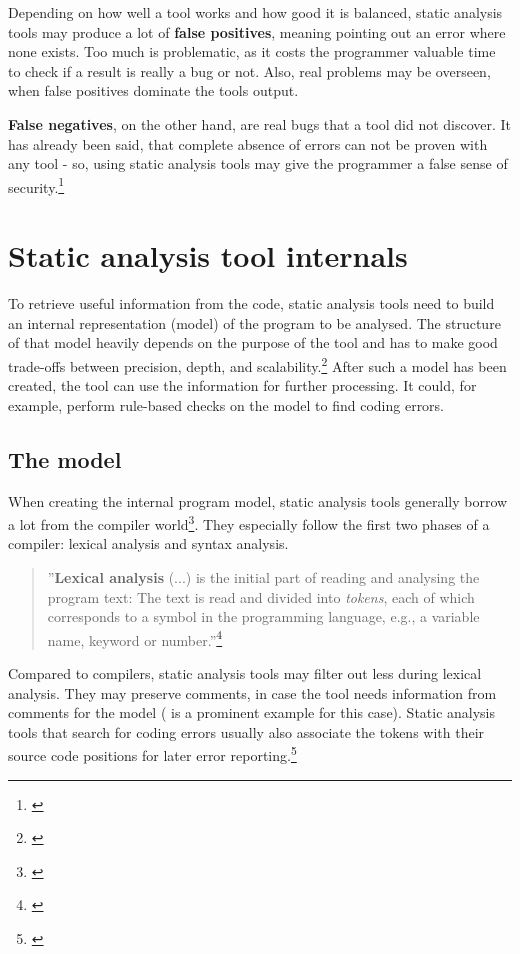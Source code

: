 Depending on how well a tool works and how good it is balanced, static analysis tools may produce a lot of \textbf{false positives}, meaning pointing out an error where none exists. Too much  is problematic, as it costs the programmer valuable time to check if a result is really a bug or not. Also, real problems may be overseen, when false positives dominate the tools output.

\textbf{False negatives}, on the other hand, are real bugs that a tool did not discover. It has already been said, that complete absence of errors can not be proven with any tool - so, using static analysis tools may give the programmer a false sense of security.\footnote{\citep[23]{SecureProgramming}}


\section{Static analysis tool internals}

To retrieve useful information from the code, static analysis tools need to build an internal representation (model) of the program to be analysed. The structure of that model heavily depends on the purpose of the tool and has to make good trade-offs between precision, depth, and scalability.\footnote{\citep[45]{SecureProgramming}} After such a model has been created, the tool can use the information for further processing. It could, for example, perform rule-based checks on the model to find coding errors.

\subsection{The model}

When creating the internal program model, static analysis tools generally borrow a lot from the compiler world\footnote{\citep[72]{SecureProgramming}}. They especially follow the first two phases of a compiler: lexical analysis and syntax analysis.

\begin{quotation}
''\textbf{Lexical analysis} (...) is the initial part of reading and analysing the program text: The text is read and divided into \textit{tokens}, each of which corresponds to a symbol in the programming language, e.g., a variable name, keyword or number.''\footnote{\citep[2]{CompilerBasics}}
\end{quotation}

Compared to compilers, static analysis tools may filter out less during lexical analysis. They may preserve comments, in case the tool needs information from comments for the model ( is a prominent example for this case).
Static analysis tools that search for coding errors usually also associate the tokens with their source code positions for later error reporting.\footnote{\citep[72]{SecureProgramming}} 

